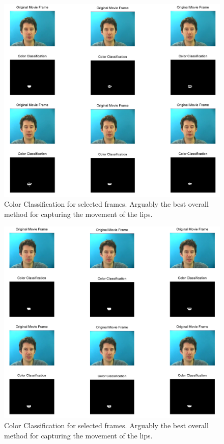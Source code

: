\documentclass{article}
\begin{document}
\begin{figure}
	\centering
	\includegraphics[width=1\textwidth]{color1.png}
	\caption{Color Classification for selected frames. Arguably the best overall method for capturing the movement of the lips.}
\end{figure}

\begin{figure}
	\centering
	\includegraphics[width=1\textwidth]{color2.png}
	\caption{Color Classification for selected frames. Arguably the best overall method for capturing the movement of the lips.}
\end{figure}
\end{document}
